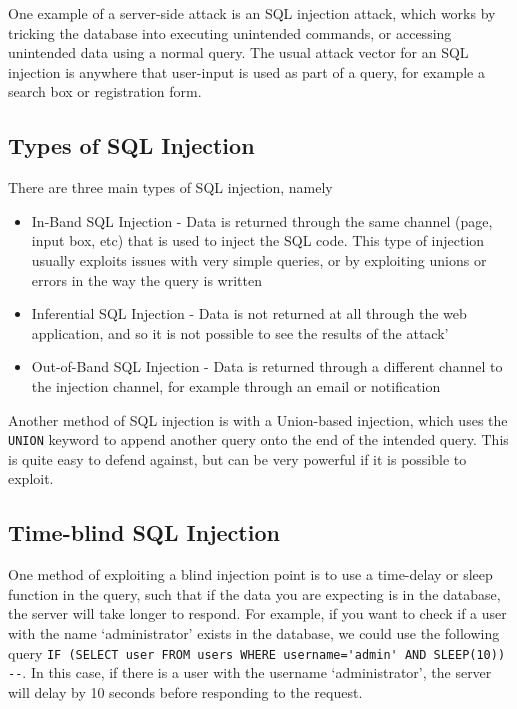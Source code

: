 One example of a server-side attack is an SQL injection attack, which works by tricking the database into executing
 unintended commands, or accessing unintended data using a normal query. The usual attack vector for an SQL injection is
 anywhere that user-input is used as part of a query, for example a search box or registration form.

\subsection*{Types of SQL Injection}

There are three main types of SQL injection, namely
\begin{itemize}
  \item In-Band SQL Injection - Data is returned through the same channel (page, input box, etc) that is used to inject
   the SQL code. This type of injection usually exploits issues with very simple queries, or by exploiting unions or
   errors in the way the query is written
  \item Inferential SQL Injection - Data is not returned at all through the web application, and so it is not possible
   to see the results of the attack'
  \item Out-of-Band SQL Injection - Data is returned through a different channel to the injection channel, for example
   through an email or notification
\end{itemize}

Another method of SQL injection is with a Union-based injection, which uses the \verb`UNION` keyword to append another
 query onto the end of the intended query. This is quite easy to defend against, but can be very powerful if it is
 possible to exploit.

\subsection*{Time-blind SQL Injection}

One method of exploiting a blind injection point is to use a time-delay or sleep function in the query, such that if the
 data you are expecting is in the database, the server will take longer to respond. For example, if you want to check if
 a user with the name `administrator' exists in the database, we could use the following query
 \verb`IF (SELECT user FROM users WHERE username='admin' AND SLEEP(10)) --`. In this case, if there is a user with the
 username `administrator', the server will delay by 10 seconds before responding to the request.


